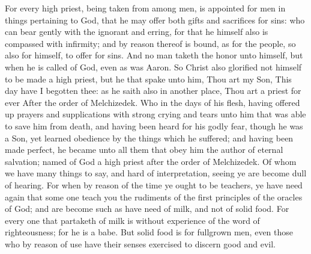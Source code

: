 For every high priest, being taken from among men, is appointed for men in things pertaining to God, that he may offer both gifts and sacrifices for sins: who can bear gently with the ignorant and erring, for that he himself also is compassed with infirmity; and by reason thereof is bound, as for the people, so also for himself, to offer for sins. And no man taketh the honor unto himself, but when he is called of God, even as was Aaron. So Christ also glorified not himself to be made a high priest, but he that spake unto him, Thou art my Son, This day have I begotten thee:  as he saith also in another place, Thou art a priest for ever After the order of Melchizedek.  Who in the days of his flesh, having offered up prayers and supplications with strong crying and tears unto him that was able to save him from death, and having been heard for his godly fear, though he was a Son, yet learned obedience by the things which he suffered; and having been made perfect, he became unto all them that obey him the author of eternal salvation; named of God a high priest after the order of Melchizedek.  Of whom we have many things to say, and hard of interpretation, seeing ye are become dull of hearing. For when by reason of the time ye ought to be teachers, ye have need again that some one teach you the rudiments of the first principles of the oracles of God; and are become such as have need of milk, and not of solid food. For every one that partaketh of milk is without experience of the word of righteousness; for he is a babe. But solid food is for fullgrown men, even those who by reason of use have their senses exercised to discern good and evil. 

